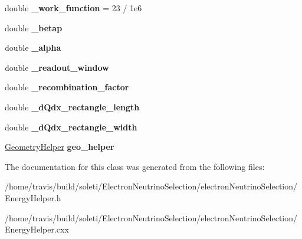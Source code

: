 \begin{DoxyCompactItemize}
\item 
\hypertarget{group__lee_gafed9eac818bc9ab7f0c0cd3c808feeea}{double {\bfseries \-\_\-work\-\_\-function} = 23 / 1e6}\label{group__lee_gafed9eac818bc9ab7f0c0cd3c808feeea}

\item 
\hypertarget{group__lee_ga6fa094a0561f3185ae9be3cd668a64fb}{double {\bfseries \-\_\-betap}}\label{group__lee_ga6fa094a0561f3185ae9be3cd668a64fb}

\item 
\hypertarget{group__lee_gac748df10e62e8969fd39c85a6c4e1e95}{double {\bfseries \-\_\-alpha}}\label{group__lee_gac748df10e62e8969fd39c85a6c4e1e95}

\item 
\hypertarget{group__lee_gad704feff08cf9f09aa46f306e126bbbb}{double {\bfseries \-\_\-readout\-\_\-window}}\label{group__lee_gad704feff08cf9f09aa46f306e126bbbb}

\item 
\hypertarget{group__lee_gafbe2338334b0bb800473d29350d866d1}{double {\bfseries \-\_\-recombination\-\_\-factor}}\label{group__lee_gafbe2338334b0bb800473d29350d866d1}

\item 
\hypertarget{group__lee_gaffce1a06abee9651a41c454aa5f9032f}{double {\bfseries \-\_\-d\-Qdx\-\_\-rectangle\-\_\-length}}\label{group__lee_gaffce1a06abee9651a41c454aa5f9032f}

\item 
\hypertarget{group__lee_ga227149dafb056c355057c753ac768b13}{double {\bfseries \-\_\-d\-Qdx\-\_\-rectangle\-\_\-width}}\label{group__lee_ga227149dafb056c355057c753ac768b13}

\item 
\hypertarget{group__lee_ga613fe58326a28695ad83ddd7bdf8ff57}{\hyperlink{classlee_1_1GeometryHelper}{Geometry\-Helper} {\bfseries geo\-\_\-helper}}\label{group__lee_ga613fe58326a28695ad83ddd7bdf8ff57}

\end{DoxyCompactItemize}


The documentation for this class was generated from the following files\-:\begin{DoxyCompactItemize}
\item 
/home/travis/build/soleti/\-Electron\-Neutrino\-Selection/electron\-Neutrino\-Selection/Energy\-Helper.\-h\item 
/home/travis/build/soleti/\-Electron\-Neutrino\-Selection/electron\-Neutrino\-Selection/Energy\-Helper.\-cxx\end{DoxyCompactItemize}
